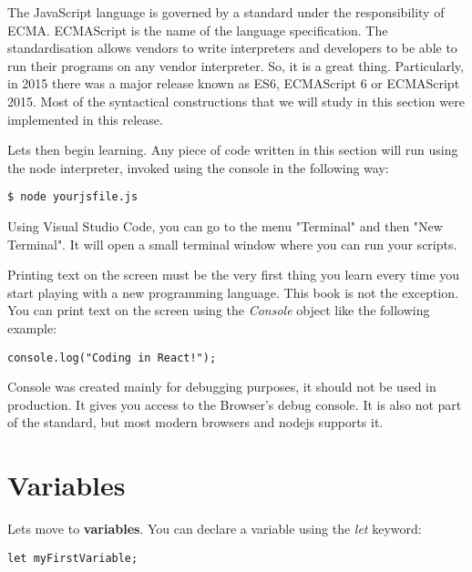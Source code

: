 \documentclass[a4paper, oneside, titlepage, 12pt]{book}
\begin{document}
The JavaScript language is governed by a standard under the responsibility of ECMA\cite{ecma}. ECMAScript is the name of the language specification. The standardisation allows vendors to write interpreters and developers to be able to run their programs on any vendor interpreter. So, it is a great thing. Particularly, in 2015 there was a major release known as ES6, ECMAScript 6 or ECMAScript 2015. Most of the syntactical constructions that we will study in this section were implemented in this release. 
\newline

Lets then begin learning. Any piece of code written in this section will run using the node interpreter, invoked using the console in the following way:
\begin{verbatim}
$ node yourjsfile.js
\end{verbatim}

Using Visual Studio Code, you can go to the menu "Terminal" and then "New Terminal". It will open a small terminal window where you can run your scripts. 
\newline

Printing text on the screen must be the very first thing you learn every time you start playing with a new programming language. This book is not the exception. You can print text on the screen using the \textit{Console} object like the following example:

\begin{verbatim}
console.log("Coding in React!");
\end{verbatim}

Console was created mainly for debugging purposes, it should not be used in production. It gives you access to the Browser's debug console. It is also not part of the standard, but most modern browsers and nodejs supports it. 
\newline

\section{Variables}

Lets move to \textbf{variables}. You can declare a variable using the \textit{let} keyword:

\begin{verbatim}
let myFirstVariable;
\end{verbatim}
\end{document}
